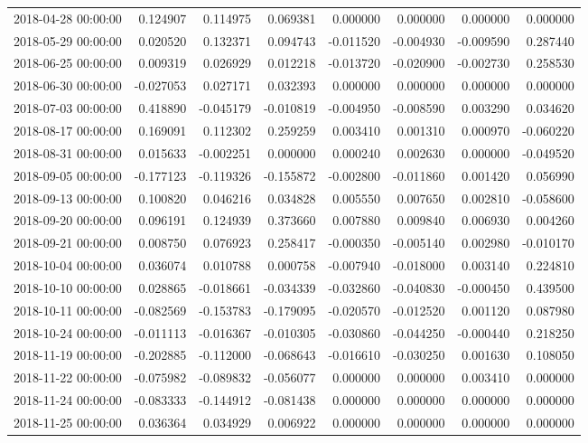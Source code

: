 \begin{tabular}{lrrrrrrr}
2018-04-28 00:00:00 & 0.124907 & 0.114975 & 0.069381 & 0.000000 & 0.000000 & 0.000000 & 0.000000 \\
2018-05-29 00:00:00 & 0.020520 & 0.132371 & 0.094743 & -0.011520 & -0.004930 & -0.009590 & 0.287440 \\
2018-06-25 00:00:00 & 0.009319 & 0.026929 & 0.012218 & -0.013720 & -0.020900 & -0.002730 & 0.258530 \\
2018-06-30 00:00:00 & -0.027053 & 0.027171 & 0.032393 & 0.000000 & 0.000000 & 0.000000 & 0.000000 \\
2018-07-03 00:00:00 & 0.418890 & -0.045179 & -0.010819 & -0.004950 & -0.008590 & 0.003290 & 0.034620 \\
2018-08-17 00:00:00 & 0.169091 & 0.112302 & 0.259259 & 0.003410 & 0.001310 & 0.000970 & -0.060220 \\
2018-08-31 00:00:00 & 0.015633 & -0.002251 & 0.000000 & 0.000240 & 0.002630 & 0.000000 & -0.049520 \\
2018-09-05 00:00:00 & -0.177123 & -0.119326 & -0.155872 & -0.002800 & -0.011860 & 0.001420 & 0.056990 \\
2018-09-13 00:00:00 & 0.100820 & 0.046216 & 0.034828 & 0.005550 & 0.007650 & 0.002810 & -0.058600 \\
2018-09-20 00:00:00 & 0.096191 & 0.124939 & 0.373660 & 0.007880 & 0.009840 & 0.006930 & 0.004260 \\
2018-09-21 00:00:00 & 0.008750 & 0.076923 & 0.258417 & -0.000350 & -0.005140 & 0.002980 & -0.010170 \\
2018-10-04 00:00:00 & 0.036074 & 0.010788 & 0.000758 & -0.007940 & -0.018000 & 0.003140 & 0.224810 \\
2018-10-10 00:00:00 & 0.028865 & -0.018661 & -0.034339 & -0.032860 & -0.040830 & -0.000450 & 0.439500 \\
2018-10-11 00:00:00 & -0.082569 & -0.153783 & -0.179095 & -0.020570 & -0.012520 & 0.001120 & 0.087980 \\
2018-10-24 00:00:00 & -0.011113 & -0.016367 & -0.010305 & -0.030860 & -0.044250 & -0.000440 & 0.218250 \\
2018-11-19 00:00:00 & -0.202885 & -0.112000 & -0.068643 & -0.016610 & -0.030250 & 0.001630 & 0.108050 \\
2018-11-22 00:00:00 & -0.075982 & -0.089832 & -0.056077 & 0.000000 & 0.000000 & 0.003410 & 0.000000 \\
2018-11-24 00:00:00 & -0.083333 & -0.144912 & -0.081438 & 0.000000 & 0.000000 & 0.000000 & 0.000000 \\
2018-11-25 00:00:00 & 0.036364 & 0.034929 & 0.006922 & 0.000000 & 0.000000 & 0.000000 & 0.000000 \\

\end{tabular}
